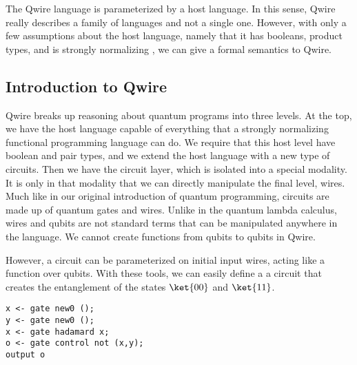 The Qwire language is parameterized by a host language.
In this sense, Qwire really describes a family of languages and not a single one.
However, with only a few assumptions about the host language, namely that it has booleans, product types, and is strongly normalizing , we can give a formal semantics to Qwire.

\subsection{Introduction to Qwire}

Qwire breaks up reasoning about quantum programs into three levels.
At the top, we have the host language capable of everything that a strongly normalizing functional programming language can do.
We require that this host level have boolean and pair types, and we extend the host language with a new type of circuits.
Then we have the circuit layer, which is isolated into a special modality.
It is only in that modality that we can directly manipulate the final level, wires.
Much like in our original introduction of quantum programming, circuits are made up of quantum gates and wires.
Unlike in the quantum lambda calculus, wires and qubits are not standard terms that can be manipulated anywhere in the language.
We cannot create functions from qubits to qubits in Qwire.

However, a circuit can be parameterized on initial input wires, acting like a function over qubits. 
With these tools, we can easily define a a circuit that creates the entanglement of the states $\ket{00}$ and $\ket{11}$.



\begin{lstlisting}[style=customcoq]
x <- gate new0 ();
y <- gate new0 ();
x <- gate hadamard x;
o <- gate control not (x,y);
output o
\end{lstlisting}

